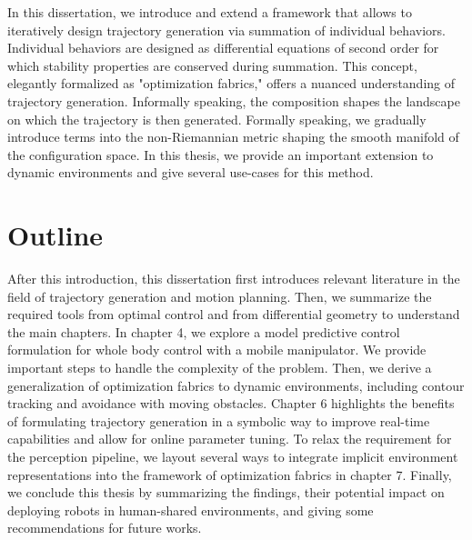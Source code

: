 In this dissertation, we introduce and extend a framework
that allows to iteratively design trajectory generation via
summation of individual behaviors. Individual behaviors are
designed as differential equations of second order for which
stability properties are conserved during summation.
This concept, elegantly formalized as "optimization
fabrics," offers a nuanced understanding of trajectory
generation. Informally speaking, the composition shapes the
landscape on which the trajectory is then generated.
Formally speaking, we gradually introduce terms into the
non-Riemannian metric shaping the smooth manifold of the
configuration space. In this thesis, we provide an important
extension to dynamic environments and give several use-cases
for this method.


\section{Outline}

After this introduction, this dissertation first introduces
relevant literature in the field of trajectory generation
and motion planning. Then, we summarize the required tools
from optimal control and from differential geometry to
understand the main chapters. In chapter 4, we explore a
model predictive control formulation for whole body control
with a mobile manipulator. We provide important steps to
handle the complexity of the problem. Then, we derive a
generalization of optimization fabrics to dynamic
environments, including contour tracking and avoidance with
moving obstacles. Chapter 6 highlights the benefits of
formulating trajectory generation in a symbolic way to
improve real-time capabilities and allow for online
parameter tuning. To relax the requirement for the
perception pipeline, we layout several ways to integrate
implicit environment representations into the framework of
optimization fabrics in chapter 7. Finally, we conclude this
thesis by summarizing the findings, their potential impact
on deploying robots in human-shared environments, and giving some
recommendations for future works.
